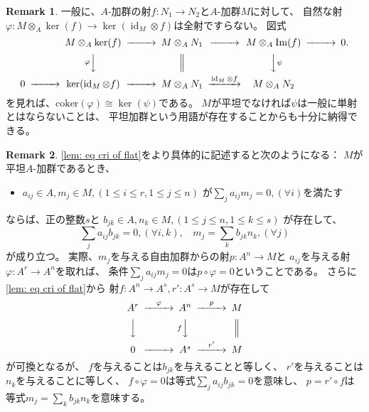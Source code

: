 \documentclass[uplatex]{jsarticle}
\theoremstyle{definition}
\newtheorem{rem}[rem]{Remark}
\theoremstyle{plain}
\DeclareMathOperator{\id}{\mathrm{id}}
\DeclareMathOperator{\im}{\mathrm{Im}}
\newcommand{\coker}{\mathrm{coker}}
\begin{document}
\begin{rem}\label{rem: flat remark}
  一般に、\(A\)-加群の射\(f:N_1\to N_2\)と\(A\)-加群\(M\)に対して、
  自然な射\(\varphi : M\otimes_A \ker(f) \to \ker(\id_M\otimes f)\)は全射ですらない。
  図式
  \[
  \begin{CD}
    @. M\otimes_A \ker(f) @>>> M\otimes_A N_1 @>>> M\otimes_A \im(f) @>>> 0. \\
    @. @V\varphi VV @| @VV\psi V @. \\
    0 @>>> \ker(\id_M\otimes f) @>>> M\otimes_A N_1 @> \id_M \otimes f >> M\otimes_A N_2 @.
  \end{CD}
  \]
  を見れば、\(\coker(\varphi) \cong \ker(\psi)\)である。
  \(M\)が平坦でなければ\(\psi\)は一般に単射とはならないことは、
  平坦加群という用語が存在することからも十分に納得できる。
\end{rem}



\begin{rem}
  \autoref{lem: eq cri of flat}をより具体的に記述すると次のようになる：
  \(M\)が平坦\(A\)-加群であるとき、
  \begin{itemize}
    \item[ \ ] \(a_{ij}\in A, m_j\in M , (1 \leq i \leq r, 1 \leq j \leq n)\)
    が\(\sum _ja_{ij}m_j = 0, (\forall i)\)を満たす
  \end{itemize}
  ならば、正の整数\(s\)と
  \(b_{jk}\in A, n_k\in M, (1 \leq j \leq n, 1 \leq k \leq s)\)
  が存在して、
  \[
  \sum _j a_{ij}b_{jk}=0 , (\forall i,k), \ \ \ \
  m_j = \sum_k b_{jk}n_k , (\forall j)
  \]
  が成り立つ。
  実際、\(m_j\)を与える自由加群からの射\(p:A^n\to M\)と
  \(a_{ij}\)を与える射\(\varphi:A^r\to A^n\)を取れば、
  条件\(\sum _ja_{ij}m_j = 0\)は\(p\circ \varphi = 0\)ということである。
  さらに\autoref{lem: eq cri of flat}から
  射\(f:A^n \to A^s, r':A^s \to M\)が存在して
  \[
  \begin{CD}
    A^r @>\varphi >> A^n @>p>> M \\
    @VVV @VfVV @| \\
    0 @>>> A^s @>r'>> M
  \end{CD}
  \]
  が可換となるが、
  \(f\)を与えることは\(b_{jk}\)を与えることと等しく、
  \(r'\)を与えることは\(n_k\)を与えることに等しく、
  \(f\circ \varphi = 0\)は等式\(\sum _j a_{ij}b_{jk}=0\)を意味し、
  \(p=r'\circ f\)は等式\(m_j = \sum_k b_{jk}n_k\)を意味する。
\end{rem}
\end{document}
